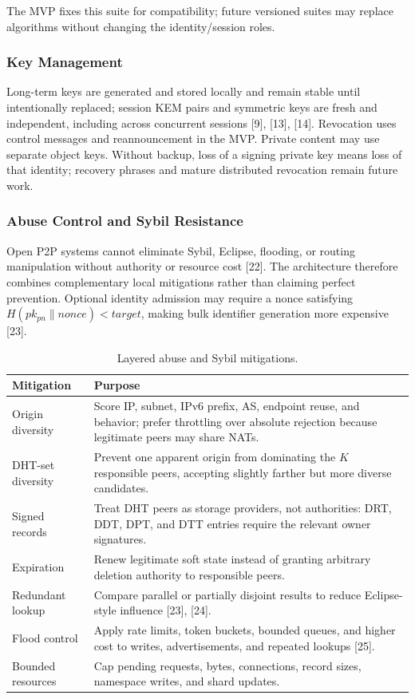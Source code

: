 \documentclass[12pt]{article}
\begin{document}
The MVP fixes this suite for compatibility; future versioned suites may replace algorithms without changing the identity/session roles.

\subsubsection{Key Management}

Long-term keys are generated and stored locally and remain stable until intentionally replaced; session KEM pairs and symmetric keys are fresh and independent, including across concurrent sessions [9], [13], [14]. Revocation uses control messages and reannouncement in the MVP. Private content may use separate object keys. Without backup, loss of a signing private key means loss of that identity; recovery phrases and mature distributed revocation remain future work.

\subsubsection{Abuse Control and Sybil Resistance}

Open P2P systems cannot eliminate Sybil, Eclipse, flooding, or routing manipulation without authority or resource cost [22]. The architecture therefore combines complementary local mitigations rather than claiming perfect prevention. Optional identity admission may require a nonce satisfying $H(pk_{pn} \parallel nonce) < target$, making bulk identifier generation more expensive [23].

\begin{table}[H]
\centering
\caption{Layered abuse and Sybil mitigations.}
\label{tab:abuse-mitigations}
\begin{tabularx}{\textwidth}{L{0.25\textwidth} Y}
\toprule
\textbf{Mitigation} & \textbf{Purpose} \\
\midrule
Origin diversity & Score IP, subnet, IPv6 prefix, AS, endpoint reuse, and behavior; prefer throttling over absolute rejection because legitimate peers may share NATs. \\
DHT-set diversity & Prevent one apparent origin from dominating the $K$ responsible peers, accepting slightly farther but more diverse candidates. \\
Signed records & Treat DHT peers as storage providers, not authorities: DRT, DDT, DPT, and DTT entries require the relevant owner signatures. \\
Expiration & Renew legitimate soft state instead of granting arbitrary deletion authority to responsible peers. \\
Redundant lookup & Compare parallel or partially disjoint results to reduce Eclipse-style influence [23], [24]. \\
Flood control & Apply rate limits, token buckets, bounded queues, and higher cost to writes, advertisements, and repeated lookups [25]. \\
Bounded resources & Cap pending requests, bytes, connections, record sizes, namespace writes, and shard updates. \\
\bottomrule
\end{tabularx}
\end{table}
\end{document}
